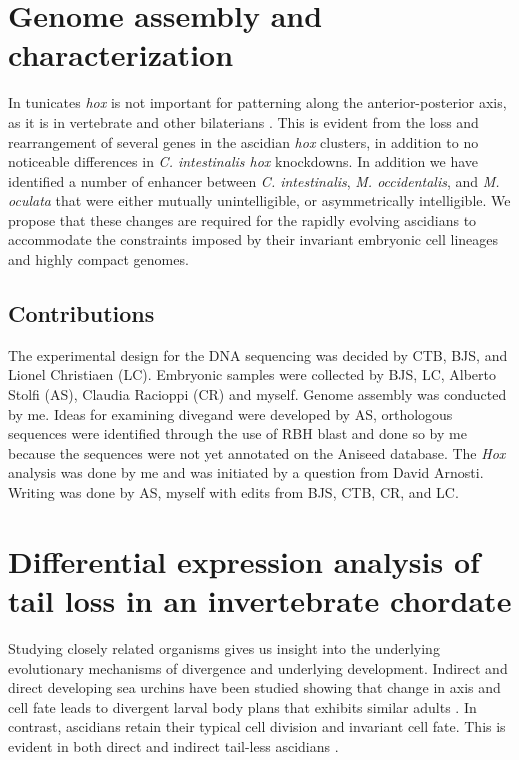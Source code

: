 \section{Genome assembly and characterization}
In tunicates \textit{hox} is not important for patterning along the anterior-posterior axis, as it is in vertebrate and other bilaterians \cite{finnerty_origins_2003,mallo_regulation_2013,ikuta_limited_2010}. This is evident from the loss and rearrangement of several genes in the ascidian \textit{hox} clusters, in addition to no noticeable differences in \textit{C. intestinalis hox} knockdowns.  In addition we have identified a number of enhancer between \textit{C. intestinalis}, \textit{M. occidentalis}, and \textit{M. oculata} that were either mutually unintelligible, or asymmetrically intelligible. We propose that these changes are required for the rapidly evolving ascidians to accommodate the constraints imposed by their invariant embryonic cell lineages and highly compact genomes.

\subsection{Contributions}
The experimental design for the DNA sequencing was decided by CTB, BJS, and Lionel Christiaen (LC). Embryonic samples were collected by BJS, LC, Alberto Stolfi (AS), Claudia Racioppi (CR) and myself. Genome assembly was conducted by me. Ideas for examining divegand were developed by AS, orthologous sequences were identified through the use of RBH blast and done so by me because the sequences were not yet annotated on the Aniseed database. The \textit{Hox} analysis was done by me and was initiated by a question from David Arnosti. Writing was done by AS, myself with edits from BJS, CTB, CR, and LC.

\section{Differential expression analysis of tail loss in an invertebrate chordate}
Studying closely related organisms gives us insight into the underlying evolutionary mechanisms of divergence and underlying development. Indirect and direct developing sea urchins have been studied showing that change in axis and cell fate leads to divergent larval body plans that exhibits similar adults \cite{wray_evolutionary_1989,henry_evolutionary_1990}. In contrast, ascidians retain their typical cell division and invariant cell fate. This is evident in both direct and indirect tail-less ascidians \cite{jeffery_evolutionary_1991,maliska_molgula_2010}. 
